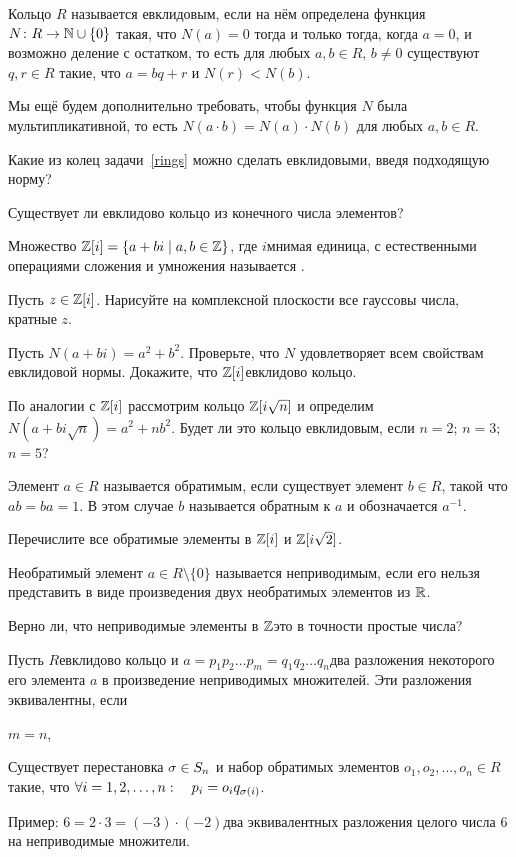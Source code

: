 \documentclass[a4paper,12pt]{article}
\begin{document}
\begin{items}{-3}
Кольцо $R$ называется  евклидовым, если на нём определена \т функция $N\colon R \rightarrow \mathbb{N}\cup\{0\}$ такая, что $N(a) = 0$ тогда и только тогда, когда $a=0$, и возможно деление с остатком, то есть для любых $a,b \in R,\,b\ne 0$ существуют $q,r\in R$ такие, что $a = bq + r$ и $N(r) < N(b)$.

Мы ещё будем дополнительно требовать, чтобы функция $N$ была  мультипликативной, то есть $N(a\cdot b) = N(a)\cdot N(b)$ для любых $a,b \in R$.

Какие из колец задачи~\ref{rings} можно сделать евклидовыми, введя подходящую норму?

Существует ли евклидово кольцо из конечного числа элементов?

Множество $\mathbb{Z}[i] = \{a+bi \mid a,b \in\mathbb{Z}\}$, где $i$\т мнимая единица, с естественными операциями сложения и умножения называется .

Пусть $z \in \mathbb{Z}[i]$. Нарисуйте на комплексной плоскости все гауссовы числа, кратные $z$.

Пусть $N(a+bi) = a^2 + b^2$.
Проверьте, что $N$ удовлетворяет всем свойствам евклидовой нормы.
Докажите, что $\mathbb{Z}[i]$\т евклидово кольцо.

По аналогии с $\mathbb{Z}[i]$ рассмотрим кольцо $\mathbb{Z}[i\sqrt n]$ и определим $N(a+bi\sqrt n) = a^2 + nb^2$. Будет ли это кольцо евклидовым, если
 $n=2$;
 $n=3$;
 $n=5$?

Элемент $a\in R$ называется  обратимым, если существует элемент $b\in R$, такой что $ab = ba = 1$. В этом случае $b$ называется  обратным к $a$ и обозначается $a^{-1}$.

Перечислите все обратимые элементы в $\mathbb{Z}[i]$ и $\mathbb{Z}[i\sqrt2]$.

Необратимый элемент $a\in R\setminus\{0\}$ называется  неприводимым, если его нельзя представить в виде произведения двух необратимых элементов из $\mathbb{R}$.

Верно ли, что неприводимые элементы в $\mathbb{Z}$\т это в точности простые числа?

\newpage

Пусть $R$\т евклидово кольцо и $a = p_1 p_2 \dots p_m = q_1 q_2 \dots q_n$\т два разложения некоторого его элемента $a$ в произведение неприводимых множителей. Эти разложения  эквивалентны, если
\begin{items}{-5}
\item
$m = n$,
\item
Существует перестановка $\sigma \in S_n$ и набор обратимых элементов $o_1, o_2, \dots, o_n \in R$ такие, что $\forall i=1,2,\dots,n: \quad p_i = o_i q_{\sigma(i)}$.
\end{items}
Пример: $6 = 2\cdot 3 = (-3)\cdot (-2)$\т два эквивалентных разложения целого числа 6 на неприводимые множители.


\end{items}
\end{document}
